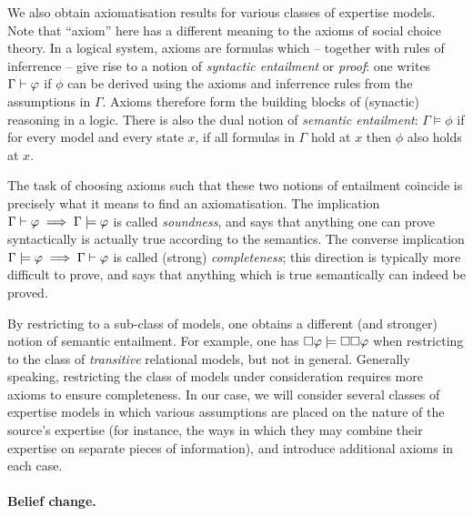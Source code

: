 {We also obtain axiomatisation results for various classes of expertise models.
Note that ``axiom'' here has a different meaning to the axioms of social choice
theory. In a logical system, axioms are formulas which -- together with rules
of inferrence -- give rise to a notion of \emph{syntactic entailment} or
\emph{proof}: one writes $\Gamma \vdash \varphi$ if $\phi$ can be derived using
the axioms and inferrence rules from the assumptions in $\Gamma$. Axioms
therefore form the building blocks of (synactic) reasoning in a logic. There is
also the dual notion of \emph{semantic entailment}: $\Gamma \models \phi$ if
for every model and every state $x$, if all formulas in $\Gamma$ hold at $x$
then $\phi$ also holds at $x$.

The task of choosing axioms such that these two notions of entailment coincide
is precisely what it means to find an axiomatisation. The implication $\Gamma
\vdash \varphi \implies \Gamma \models \varphi$ is called \emph{soundness}, and
says that anything one can prove syntactically is actually true according to
the semantics. The converse implication $\Gamma \models \varphi \implies \Gamma
\vdash \varphi$ is called (strong) \emph{completeness};\footnotemark{} this
direction is typically more difficult to prove, and says that anything which is
true semantically can indeed be proved.


By restricting to a sub-class of models, one obtains a different (and stronger)
notion of semantic entailment. For example, one has $\Box\varphi \models
\Box\Box\varphi$ when restricting to the class of \emph{transitive}
relational models, but not in general. Generally speaking, restricting the
class of models under consideration requires more axioms to ensure
completeness. In our case, we will consider several classes of expertise models
in which various assumptions are placed on the nature of the source's expertise
(for instance, the ways in which they may combine their expertise on separate
pieces of information), and introduce additional axioms in each case.

}

\paragraph{Belief change.}

